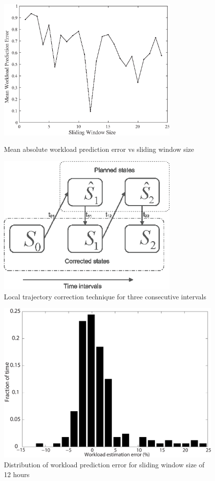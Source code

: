 \begin{figure}[htbp]
  \begin{minipage}{0.45\textwidth}
    \centering
    \includegraphics[width=0.8\textwidth]{pics/workload-pred-error-mean.eps}
    \caption{Mean absolute workload prediction error vs sliding window size}
    \label{fig:workload-pred-error-mean}
  \end{minipage}
  \begin{minipage}{0.45\textwidth}
    \centering         
    \includegraphics[width=0.8\textwidth]{pics/traj-corr.eps}
    \caption{Local trajectory correction technique for three consecutive intervals}
    \label{fig:traj-corr}
    \end{minipage}
\end{figure}

\begin{figure}
\centering
\includegraphics[width=0.5\linewidth]{pics/workload-pred-error-2.eps}
    \caption{Distribution of workload prediction error for sliding window size of 12 hours}
    \label{fig:workload-pred-error-dist}
    \end{figure}
    
